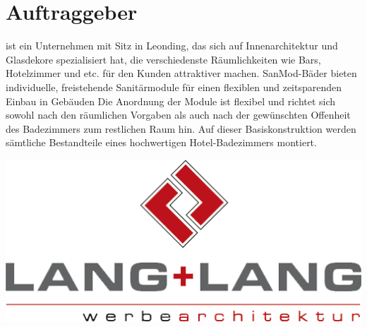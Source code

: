 \section*{Auftraggeber}

{\projectpartner} ist ein Unternehmen mit Sitz in Leonding, das sich auf Innenarchitektur und Glasdekore spezialisiert hat, 
die verschiedenste Räumlichkeiten wie Bars, Hotelzimmer und etc. für den Kunden attraktiver machen. 
SanMod-Bäder bieten individuelle, freistehende Sanitärmodule für einen flexiblen und zeitsparenden Einbau in Gebäuden
Die Anordnung der Module ist flexibel und richtet sich sowohl nach den räumlichen Vorgaben als auch nach der gewünschten 
Offenheit des Badezimmers zum restlichen Raum hin.
Auf dieser Basiskonstruktion werden sämtliche Bestandteile eines hochwertigen Hotel-Badezimmers montiert.


\includegraphics[scale=.3,right]{images/LL_Logo_skaliert.png}